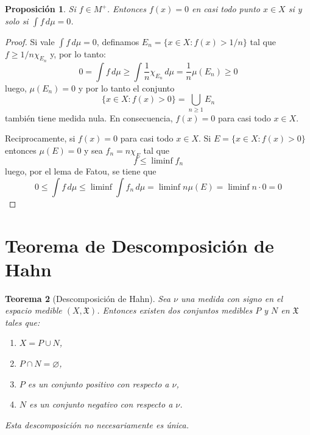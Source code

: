 \documentclass[12pt,a4paper]{article}
\theoremstyle{profesional}
\newtheorem{teorema}{Teorema}[section]
\newtheorem{proposicion}[teorema]{Proposición}
\theoremstyle{definicion-style}
\newcommand{\X}{\mathfrak{X}}
\begin{document}
\begin{proposicion}\label{prop:funcion_casi_nula}
    Si \( f \in M^+ \). Entonces \( f(x) = 0 \) en casi todo punto \( x \in X \) si y solo si \( \int f \, d\mu = 0 \).
\end{proposicion}
\begin{proof}
    Si vale \( \int f \, d \mu = 0 \), definamos \( E_n = \{ x \in X : f(x) > 1/n \} \) tal que \( f \geq 1/n \chi_{E_n} \) y, por lo tanto:\[
        0 = \int f \, d \mu \geq \int \frac{1}{n} \chi_{E_n} \, d \mu = \frac{1}{n} \mu(E_n) \geq 0
    \]
    luego, \( \mu(E_n) = 0 \) y por lo tanto el conjunto \[
        \{ x \in X : f(x) > 0 \} = \bigcup_{n \geq 1} E_n
    \]
    también tiene medida nula. En consecuencia, \( f(x) = 0 \) para casi todo \( x \in X \).

    Reciprocamente, si \( f(x) = 0 \) para casi todo \( x \in X \). Si \( E = \{ x \in X : f(x) > 0 \} \) entonces \( \mu(E) = 0 \) y sea \( f_n = n \chi_E \) tal que \[
        f \leq \liminf f_n
    \]
    luego, por el lema de Fatou, se tiene que \[
        0 \leq \int f \, d \mu \leq \liminf \int f_n \, d \mu = \liminf n \mu(E) = \liminf n \cdot 0 = 0
    \]
\end{proof}

\section{Teorema de Descomposición de Hahn}

\begin{teorema}[Descomposición de Hahn]
    Sea \(\nu \) una medida con signo en el espacio medible \((X, \X)\). Entonces existen dos conjuntos medibles \(P\) y \(N\) en \(\X \) tales que:
    \begin{enumerate}[label = (\roman*)]
        \item \(X = P \cup N\),
        \item \(P \cap N = \varnothing \),
        \item \(P\) es un conjunto positivo con respecto a \(\nu \),
        \item \(N\) es un conjunto negativo con respecto a \(\nu \).
    \end{enumerate}
    Esta descomposición no necesariamente es única.
\end{teorema}
\end{document}
